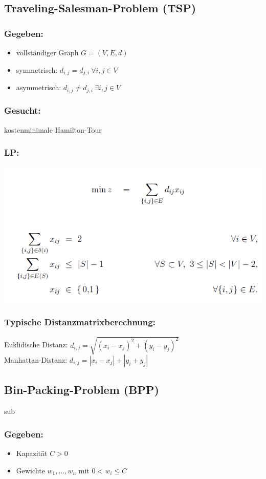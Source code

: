 \documentclass[12pt]{article}
\begin{document}
		\subsection{Traveling-Salesman-Problem (TSP)}\label{TSP}
			\subsubsection*{Gegeben:}
			\begin{itemize}
				\item vollständiger Graph $G=(V,E,d)$
				\item symmetrisch: $d_{i,j}=d_{j,i}\> \forall i,j\in V$
				\item asymmetrisch: $d_{i,j}\neq d_{j,i}\> \exists i,j \in V$
			\end{itemize}
			\subsubsection*{Gesucht:}
			kostenminimale Hamilton-Tour
			
			\subsubsection*{LP:}
				\includegraphics[scale=0.6]{TSPLP}
			
			\subsubsection{Typische Distanzmatrixberechnung:}
			Euklidische Distanz: $d_{i,j}=\sqrt{(x_i-x_j)^2+(y_i-y_j)^2}$ \\
			Manhattan-Distanz: $d_{i,j}=|x_i-x_j|+|y_i+y_j|$
		\subsection{Bin-Packing-Problem (BPP)}
	sub		\subsubsection*{Gegeben:}
				\begin{itemize}
					\item Kapazität $C>0$
					\item Gewichte $w_1,\dots,w_n$ mit $0<w_i\le C$
				\end{itemize}
\end{document}
